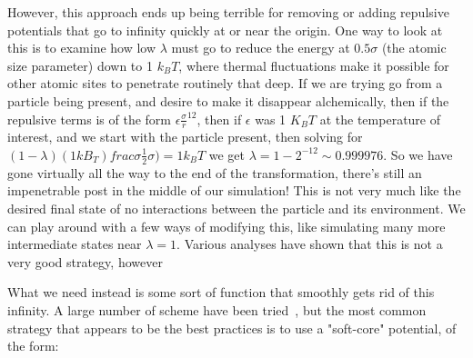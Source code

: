 \documentclass[9pt,bestpractices]{livecoms}
\begin{document}
However, this approach ends up being terrible for removing or adding repulsive potentials that go to infinity quickly at or near the origin. One way to look at this is to examine how low $\lambda$ must go to reduce the energy at $0.5\sigma$ (the atomic size parameter) down to 1 $k_BT$, where thermal fluctuations make it possible for other atomic sites to penetrate routinely that deep. If we are trying go from a particle being present, and desire to make it disappear alchemically, then if the repulsive terms is of the form $\epsilon\frac{\sigma}{r}^{12}$, then if $\epsilon$ was 1 $K_BT$ at the temperature of interest, and we start with the particle present, then solving for $(1-\lambda)(1 kB_T){frac}{\sigma}{\frac{1}{2}\sigma}) = 1 k_B T$ we get $\lambda = 1-2^{-12} \sim 0.999976$.  So we have gone virtually all the way to the end of the transformation, there's still an impenetrable post in the middle of our simulation! This is not very much like the desired final state of no interactions between the particle and its environment. We can play around with a few ways of modifying this, like simulating many more intermediate states near $\lambda=1$. Various analyses have shown that this is not a very good strategy, however~\cite{Pham:JCP2011,Beutler:CPL:1994,Zacharias:JPC:1994,Blondel:JCC:2004}

What we need instead is some sort of function that smoothly gets rid of this infinity.  A large number of scheme have been tried~\cite{Beutler:CPL:1994,Zacharias:JPC:1994,Blondel:JCC:2004,Pham:JCP:2011,Pham:JCP:2011,Naden:JCTC:2014,Beutler:JCP,Donnini:JCC:2005,OTHERS!!!!}, but the most common strategy that appears to be the best practices is to use a "soft-core" potential, of the form:
\end{document}
